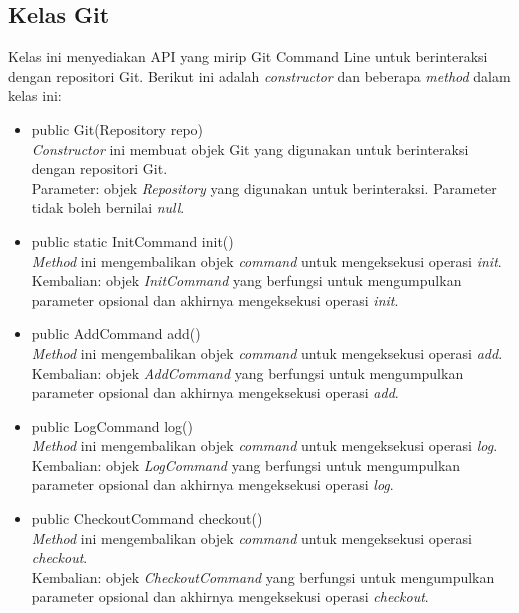 \subsection{Kelas Git}
\label{subsec:Git}
Kelas ini menyediakan API yang mirip Git Command Line untuk berinteraksi dengan repositori Git. Berikut ini adalah \textit{constructor} dan beberapa \textit{method} dalam kelas ini:
\begin{itemize}
\item public Git(Repository repo)\\
\textit{Constructor} ini membuat objek Git yang digunakan untuk berinteraksi dengan repositori Git.\\
Parameter: objek \textit{Repository} yang digunakan untuk berinteraksi. Parameter tidak boleh bernilai \textit{null}. 

\item public static InitCommand init()\\
\textit{Method} ini mengembalikan objek \textit{command} untuk mengeksekusi operasi \textit{init}.\\
Kembalian: objek \textit{InitCommand} yang berfungsi untuk mengumpulkan parameter opsional dan akhirnya mengeksekusi operasi \textit{init}.

\item public AddCommand add()\\
\textit{Method} ini mengembalikan objek \textit{command} untuk mengeksekusi operasi \textit{add}.\\
Kembalian: objek \textit{AddCommand} yang berfungsi untuk mengumpulkan parameter opsional dan akhirnya mengeksekusi operasi \textit{add}.

\item public LogCommand log()\\
\textit{Method} ini mengembalikan objek \textit{command} untuk mengeksekusi operasi \textit{log}.\\
Kembalian: objek \textit{LogCommand} yang berfungsi untuk mengumpulkan parameter opsional dan akhirnya mengeksekusi operasi \textit{log}.

\item public CheckoutCommand checkout()\\
\textit{Method} ini mengembalikan objek \textit{command} untuk mengeksekusi operasi \textit{checkout}.\\
Kembalian: objek \textit{CheckoutCommand} yang berfungsi untuk mengumpulkan parameter opsional dan akhirnya mengeksekusi operasi \textit{checkout}.


\end{itemize}
